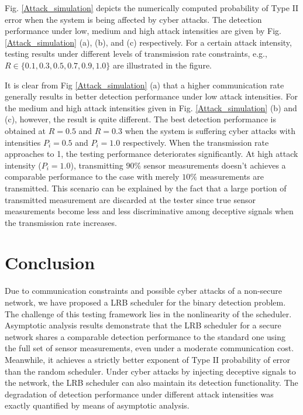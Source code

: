 \documentclass[journal]{IEEEtran}
\begin{document}
Fig. \ref{Attack_simulation} depicts the numerically computed probability of Type II error when the system is being affected by cyber attacks. The detection performance under low, medium and high attack intensities are given by Fig. \ref{Attack_simulation} (a), (b), and (c) respectively. For a certain attack intensity, testing results under different levels of transmission rate constraints, e.g., $R\in\{0.1,0.3,0.5,0.7,0.9,1.0\}$ are illustrated in the figure.

It is clear from Fig \ref{Attack_simulation} (a) that a higher communication rate generally results in better detection performance under low attack intensities. For the medium and high attack intensities given in Fig. \ref{Attack_simulation} (b) and (c), however, the result is quite different. The best detection performance is obtained at $R=0.5$ and $R=0.3$ when the system is suffering cyber attacks with intensities $P_i=0.5$ and $P_i=1.0$ respectively. When the transmission rate approaches to 1, the testing performance deteriorates significantly. At high attack intensity ($P_i=1.0$), transmitting $90\%$ sensor measurements doesn't achieves a comparable performance to the case with merely $10\%$ measurements are transmitted. This scenario can be explained by the fact that a large portion of transmitted measurement are discarded at the tester since true sensor measurements become less and less discriminative among deceptive signals when the transmission rate increases.

































\section{Conclusion}

Due to communication constraints and possible cyber attacks of a non-secure network, we have proposed a LRB scheduler for the binary detection problem.  The challenge of this testing framework lies in the nonlinearity of the scheduler.
Asymptotic analysis results demonstrate that the LRB scheduler for a secure network shares a comparable detection performance to the standard one using the full set of sensor measurements, even under a moderate communication cost. Meanwhile,  it achieves a strictly better exponent of  Type II probability of error than the random scheduler. Under cyber attacks by injecting deceptive signals to the network, the LRB scheduler can also maintain its detection functionality. The degradation of detection performance under different attack intensities was exactly quantified by means of asymptotic analysis.
\end{document}
